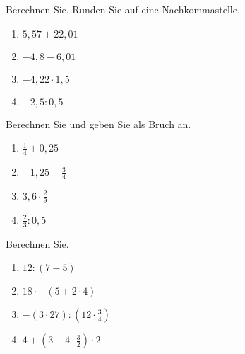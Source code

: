 \documentclass[11pt, a4paper, oneside]{article}
\begin{document}
	\checkered[5cm]
	
	
	Berechnen Sie. Runden Sie auf eine Nachkommastelle.
	
	\begin{multicols}{4}
		\begin{enumerate}[label=\alph*)]
			\item $5,57 + 22,01$
			\item $-4,8 - 6,01$
			\item $-4,22 \cdot 1,5$
			\item $-2,5 : 0,5$
		\end{enumerate}
	\end{multicols}
	
	\checkered[6.5cm]
	
	
	Berechnen Sie und geben Sie als Bruch an.
	
	\begin{multicols}{4}
		\begin{enumerate}[label=\alph*)]
			\item $\frac{1}{4} + 0,25$
			\item $-1,25 - \frac{3}{4}$
			\item $3,6 \cdot \frac{2}{9}$
			\item $\frac{2}{3} : 0,5$
		\end{enumerate}
	\end{multicols}
	
	\checkered[6.5cm]
	
	
	Berechnen Sie.
	
	\begin{multicols}{4}
		\begin{enumerate}[label=\alph*)]
			\item $12 : (7 - 5)$
			\item $18 \cdot -(5 + 2 \cdot 4)$
			\item $-(3 \cdot 27) : (12 \cdot \frac{3}{4})$
			\item $4 + (3 - 4 \cdot \frac{3}{2}) \cdot 2$
		\end{enumerate}
	\end{multicols}
	
	\checkered[8cm]
	
	
\end{document}
